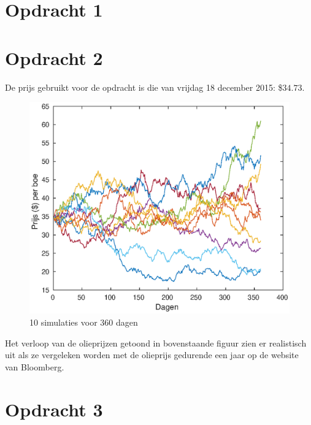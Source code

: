 \documentclass[11pt,a4paper]{article}
\begin{document}
\begin{titlepage}

\vfill %

\end{titlepage}

\section*{Opdracht 1}



\section*{Opdracht 2}
De prijs gebruikt voor de opdracht is die van vrijdag 18 december 2015: \$$34.73$.

\begin{figure}[H]
\centering
\includegraphics[scale=0.75]{opdracht2}
\caption{10 simulaties voor 360 dagen}
\end{figure}

\noindent
Het verloop van de olieprijzen getoond in bovenstaande figuur zien er realistisch uit als ze vergeleken worden met de olieprijs gedurende een jaar op de website van Bloomberg.



\section*{Opdracht 3}
\end{document}
